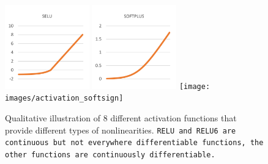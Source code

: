 \begin{figure}[H]
{\includegraphics[width=0.325\textwidth]{images/activation_selu}}
{\includegraphics[width=0.325\textwidth]{images/activation_softplus}}
{\texttt{[image: images/activation\_softsign]}}
\vspace{1em}
\caption[Activation Functions]{Qualitative illustration of 8 different activation functions that provide different types of nonlinearities. \tt{RELU} and \tt{RELU6} are continuous but not everywhere differentiable functions, the other functions are continuously differentiable.}
\label{f.postagging.activation}
\end{figure}

